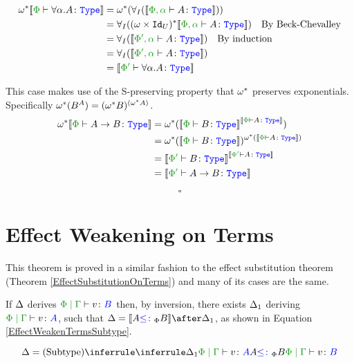     \begin{align*}
        \w\star\deno{\typerelation{\P}{\all{\a}A}{\type}} & = \w\star(\allI(\deno{\typerelation{\P,\a}{A}{\type}}))\\
        & = \allI((\w\times\Id{U})\star\deno{\typerelation{\P,\a}{A}{\type}})\qt{By Beck-Chevalley}\\
        & = \allI(\deno{\typerelation{\P',\a}{A}{\type}})\qt{By induction}\\
        & = \allI(\deno{\typerelation{\P',\a}{A}{\type}})\\
        & = \deno{\typerelation{\P'}{\all{\a}{A}}{\type}}\\
    \end{align*}

\case{\tfun}
This case makes use of the S-preserving property that $\omega^*$ preserves exponentials. Specifically $\omega^*(B^A) = (\omega^* B)^{(\omega^* A)}$.
\begin{align*}
    \w\star\deno{\typerelation{\P}{\ab}{\type}} &= \w\star(\deno{\typerelation{\P}{B}{\type}}^{\deno{\typerelation{\P}{A}{\type}}})\\
    &=\w\star(\deno{\typerelation{\P}{B}{\type}})^{\w\star(\deno{\typerelation{\P}{A}{\type}})}\\
    & = \deno{\typerelation{\P'}{B}{\type}}^{\deno{\typerelation{\P'}{A}{\type}}}\\
    & = \deno{\typerelation{\P'}{\ab}{\type}}\\
\end{align*}

$$\square$$

\section{Effect Weakening on Terms} \label{AppendixEffectWeakeningOnTerms}
This theorem is proved in a similar fashion to the effect substitution theorem (Theorem \ref{EffectSubstitutionOnTerms}) and many of its cases are the same.

\case{\vsubtype}
If $\Delta$ derives $\gpetyperelation{v}{B}$ then, by inversion, there exists $\Delta_1$ deriving $\gpetyperelation{v}{A}$, such that $ \D = \deno{A\subtypep B}\after \D_1$, as shown in Equation \ref{EffectWeakenTermsSubtype}.

\begin{equation}
    \label{EffectWeakenTermsSubtype}
    \D = \ntreeruleII{\vsubtype}{\treeruleI{\D_1}{\gpetyperelation{v}{A}}}{ A \subtypep B}{\gpetyperelation{v}{B}}
\end{equation}

